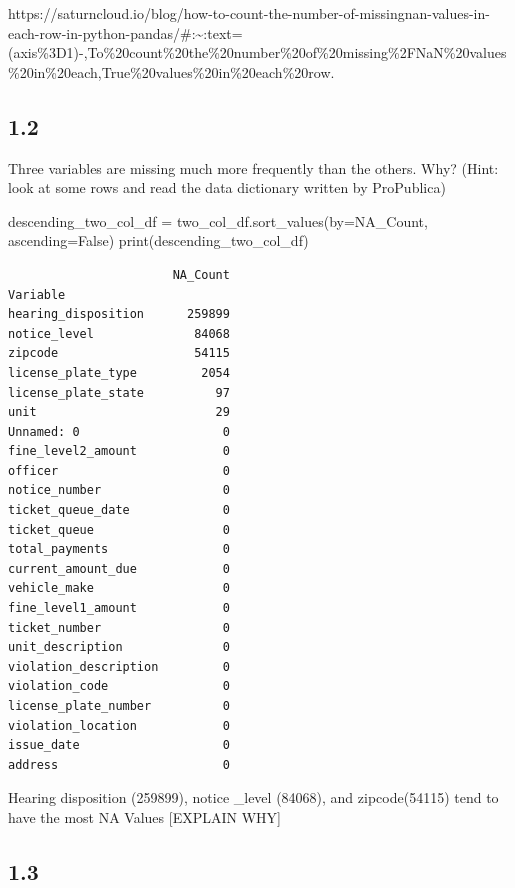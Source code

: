\documentclass[
  letterpaper,
  DIV=11,
  numbers=noendperiod]{scrartcl}
\newenvironment{Shaded}{\begin{snugshade}}{\end{snugshade}}
\newcommand{\BuiltInTok}[1]{\textcolor[rgb]{0.00,0.23,0.31}{#1}}
\newcommand{\NormalTok}[1]{\textcolor[rgb]{0.00,0.23,0.31}{#1}}
\newcommand{\OperatorTok}[1]{\textcolor[rgb]{0.37,0.37,0.37}{#1}}
\newcommand{\StringTok}[1]{\textcolor[rgb]{0.13,0.47,0.30}{#1}}
\newcommand{\VariableTok}[1]{\textcolor[rgb]{0.07,0.07,0.07}{#1}}
\begin{document}
https://saturncloud.io/blog/how-to-count-the-number-of-missingnan-values-in-each-row-in-python-pandas/\#:\textasciitilde:text=(axis\%3D1)-,To\%20count\%20the\%20number\%20of\%20missing\%2FNaN\%20values\%20in\%20each,True\%20values\%20in\%20each\%20row.

\subsection{1.2}\label{section-1}

Three variables are missing much more frequently than the others. Why?
(Hint: look at some rows and read the data dictionary written by
ProPublica)

\begin{Shaded}
\begin{Highlighting}[]
\NormalTok{descending\_two\_col\_df }\OperatorTok{=}\NormalTok{ two\_col\_df.sort\_values(by}\OperatorTok{=}\StringTok{\textquotesingle{}NA\_Count\textquotesingle{}}\NormalTok{, ascending}\OperatorTok{=}\VariableTok{False}\NormalTok{)}
\BuiltInTok{print}\NormalTok{(descending\_two\_col\_df)}
\end{Highlighting}
\end{Shaded}

\begin{verbatim}
                       NA_Count
Variable                       
hearing_disposition      259899
notice_level              84068
zipcode                   54115
license_plate_type         2054
license_plate_state          97
unit                         29
Unnamed: 0                    0
fine_level2_amount            0
officer                       0
notice_number                 0
ticket_queue_date             0
ticket_queue                  0
total_payments                0
current_amount_due            0
vehicle_make                  0
fine_level1_amount            0
ticket_number                 0
unit_description              0
violation_description         0
violation_code                0
license_plate_number          0
violation_location            0
issue_date                    0
address                       0
\end{verbatim}

Hearing disposition (259899), notice \_level (84068), and zipcode(54115)
tend to have the most NA Values {[}EXPLAIN WHY{]}

\subsection{1.3}\label{section-2}
\end{document}
